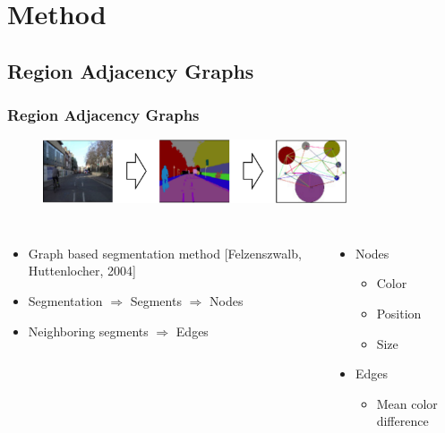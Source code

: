 \section{Method}
\subsection{Region Adjacency Graphs}
\frame
{
	\frametitle{Region Adjacency Graphs}
	
	\begin{figure}[p]
		\centering
		\includegraphics[width = 0.8\textwidth]{img/master/cover}
		\label{fig:rag}
	\end{figure}
	
	\begin{columns}[T]
		\begin{itemize}
			\item Graph based segmentation method [Felzenszwalb, Huttenlocher, 2004]
			\item Segmentation $\Rightarrow$ Segments $\Rightarrow$ Nodes
			\item Neighboring segments $\Rightarrow$ Edges
		\end{itemize}
		
		
		\vspace{-0.5cm}
		\begin{itemize}
			\item Nodes
			\begin{itemize}
				\item Color
				\item Position
				\item Size
			\end{itemize}
			\item Edges
			\begin{itemize}
				\item Mean color difference
			\end{itemize}
		\end{itemize}
	\end{columns}
	
}